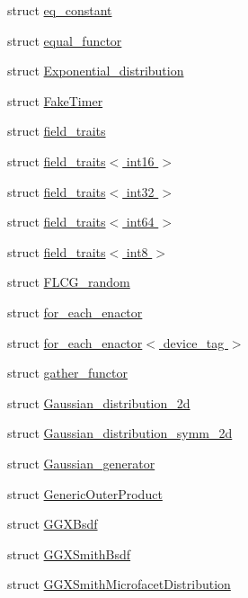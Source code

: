 \begin{DoxyCompactItemize}
struct \hyperlink{structcugar_1_1eq__constant}{eq\+\_\+constant}
\item 
struct \hyperlink{structcugar_1_1equal__functor}{equal\+\_\+functor}
\item 
struct \hyperlink{structcugar_1_1_exponential__distribution}{Exponential\+\_\+distribution}
\item 
struct \hyperlink{structcugar_1_1_fake_timer}{Fake\+Timer}
\item 
struct \hyperlink{structcugar_1_1field__traits}{field\+\_\+traits}
\item 
struct \hyperlink{structcugar_1_1field__traits_3_01int16_01_4}{field\+\_\+traits$<$ int16 $>$}
\item 
struct \hyperlink{structcugar_1_1field__traits_3_01int32_01_4}{field\+\_\+traits$<$ int32 $>$}
\item 
struct \hyperlink{structcugar_1_1field__traits_3_01int64_01_4}{field\+\_\+traits$<$ int64 $>$}
\item 
struct \hyperlink{structcugar_1_1field__traits_3_01int8_01_4}{field\+\_\+traits$<$ int8 $>$}
\item 
struct \hyperlink{structcugar_1_1_f_l_c_g__random}{F\+L\+C\+G\+\_\+random}
\item 
struct \hyperlink{structcugar_1_1for__each__enactor}{for\+\_\+each\+\_\+enactor}
\item 
struct \hyperlink{structcugar_1_1for__each__enactor_3_01device__tag_01_4}{for\+\_\+each\+\_\+enactor$<$ device\+\_\+tag $>$}
\item 
struct \hyperlink{structcugar_1_1gather__functor}{gather\+\_\+functor}
\item 
struct \hyperlink{structcugar_1_1_gaussian__distribution__2d}{Gaussian\+\_\+distribution\+\_\+2d}
\item 
struct \hyperlink{structcugar_1_1_gaussian__distribution__symm__2d}{Gaussian\+\_\+distribution\+\_\+symm\+\_\+2d}
\item 
struct \hyperlink{structcugar_1_1_gaussian__generator}{Gaussian\+\_\+generator}
\item 
struct \hyperlink{structcugar_1_1_generic_outer_product}{Generic\+Outer\+Product}
\item 
struct \hyperlink{structcugar_1_1_g_g_x_bsdf}{G\+G\+X\+Bsdf}
\item 
struct \hyperlink{structcugar_1_1_g_g_x_smith_bsdf}{G\+G\+X\+Smith\+Bsdf}
\item 
struct \hyperlink{structcugar_1_1_g_g_x_smith_microfacet_distribution}{G\+G\+X\+Smith\+Microfacet\+Distribution}
\item 

\end{DoxyCompactItemize}
